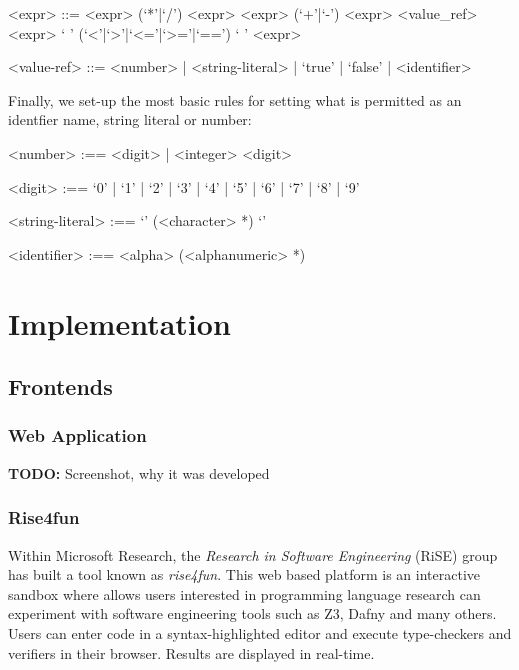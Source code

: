 \documentclass[a4paper,openany,12pt]{book}
\newcommand{\todobox}[1] {\colorbox{todocolor}{\parbox{\dimexpr \linewidth-\columnsep}{\vspace{.75\baselineskip}\centering\parbox{0.95\linewidth}{\faIcon{lightbulb} \textbf{TODO:} #1\vspace{.75\baselineskip}}}}}
\begin{document}
\begin{grammar}
<expr> ::= <expr> (`*'|`/') <expr>
    \alt <expr> (`+'|`-') <expr>
    \alt <value_ref>
    \alt <expr> ` ' (`<'|`>'|`<='|`>='|`==') ` ' <expr>

<value-ref> ::= <number> | <string-literal> | `true' | `false' | <identifier>
\end{grammar}

Finally, we set-up the most basic rules for setting what is permitted as an identfier name, string literal or
number:

\begin{grammar}
    <number> :== <digit> | <integer> <digit>

    <digit> :== `0' | `1' | `2' | `3' | `4' | `5' | `6' | `7' | `8' | `9'

    <string-literal> :== `\textquotedbl{}' (<character> *) `\textquotedbl{}'

    <identifier> :== <alpha> (<alphanumeric> *)
\end{grammar}

\section{Implementation}

\subsection{Frontends}

\subsubsection{Web Application}

\todobox{Screenshot, why it was developed}

\subsubsection{Rise4fun}

Within Microsoft Research, the \emph{Research in Software Engineering} (RiSE) group has built a tool known as
\emph{rise4fun}.
This web based platform is an interactive sandbox where allows users interested in programming language research can
experiment with software engineering tools such as Z3, Dafny and many others.
Users can enter code in a syntax-highlighted editor and execute type-checkers and verifiers in their browser.
Results are displayed in real-time.
\end{document}
